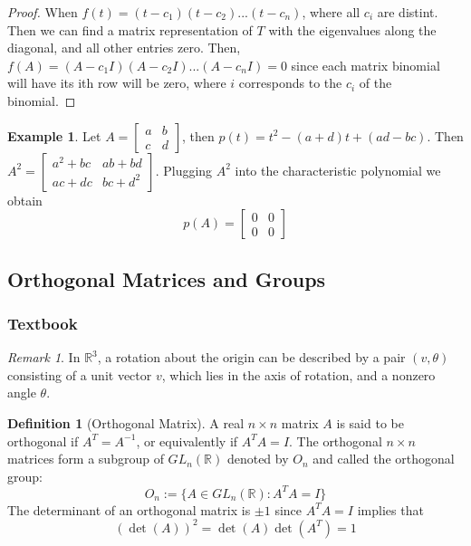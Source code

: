 \documentclass[12pt]{article}
\theoremstyle{definition}
\newtheorem{defn}[thm]{Definition}
\newtheorem{eg}[thm]{Example}
\theoremstyle{remark}
\newtheorem{rmk}[thm]{Remark}
\numberwithin{equation}{section}
\newcommand\R{\mathbb R}    %
\begin{document}
\begin{proof}
        When $f(t) = (t-c_1)(t-c_2)...(t-c_n)$, where all $c_i$ are distint. Then we can find a matrix representation of $T$ with the eigenvalues along the diagonal, and all other entries zero. Then, $f(A) = (A-c_1I)(A-c_2I)...(A-c_nI) = 0$ since each matrix binomial will have its ith row will be zero, where $i$ corresponds to the $c_i$ of the binomial.
\end{proof}


\vspace{15pt}

\begin{eg}
        Let $A = \begin{bmatrix} a& b \\ c & d\end{bmatrix}$, then $p(t) = t^2 - (a+d)t + (ad - bc)$. Then $A^2 = \begin{bmatrix} a^2+bc & ab+bd \\ ac+dc & bc+d^2 \end{bmatrix}$. Plugging $A^2$ into the characteristic polynomial we obtain \begin{equation}
                p(A) = \begin{bmatrix} 0 & 0 \\ 0 & 0 \end{bmatrix}
\end{equation}
\end{eg}


\subsection{Orthogonal Matrices and Groups}

\subsubsection{Textbook}

\begin{rmk}
        In $\R^3$, a rotation about the origin can be described by a pair $(v,\theta)$ consisting of a unit vector $v$, which lies in the axis of rotation, and a nonzero angle $\theta$.
\end{rmk}


\vspace{15pt}

\begin{defn}[Orthogonal Matrix]
        A real $n\times n$ matrix $A$ is said to be orthogonal if $A^T = A^{-1}$, or equivalently if $A^TA = I$. The orthogonal $n\times n$ matrices form a subgroup of $GL_n(\R)$ denoted by $O_n$ and called the orthogonal group: \begin{equation}
                O_n := \{A \in GL_n(\R): A^TA = I\}
        \end{equation}
        The determinant of an orthogonal matrix is $\pm 1$ since $A^TA = I$ implies that \begin{equation}
                (\det(A))^2 = \det(A)\det(A^T) = 1
        \end{equation}
\end{defn}
\end{document}
